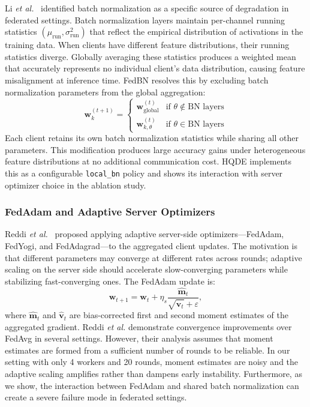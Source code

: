 \documentclass[journal,twoside]{IEEEtran}
\newcommand{\hqde}{\mbox{HQDE}\xspace}
\newcommand{\etal}{\textit{et al.}\xspace}
\begin{document}
Li \etal~\cite{li2021fedbn} identified batch normalization as a
specific source of degradation in federated settings. Batch
normalization layers maintain per-channel running statistics
$(\mu_{\text{run}}, \sigma^2_{\text{run}})$ that reflect the
empirical distribution of activations in the training data. When
clients have different feature distributions, their running statistics
diverge. Globally averaging these statistics produces a weighted mean
that accurately represents no individual client's data distribution,
causing feature misalignment at inference time. FedBN resolves this
by excluding batch normalization parameters from the global aggregation:
\begin{equation}
  \mathbf{w}_k^{(t+1)} = \begin{cases}
    \mathbf{w}_{\text{global}}^{(t)} &
      \text{if } \theta \notin \text{BN layers} \\
    \mathbf{w}_{k,\theta}^{(t)} &
      \text{if } \theta \in \text{BN layers}
  \end{cases}
  \label{eq:fedbn}
\end{equation}
Each client retains its own batch normalization statistics while sharing
all other parameters. This modification produces large accuracy gains
under heterogeneous feature distributions at no additional communication
cost. \hqde{} implements this as a configurable \texttt{local\_bn}
policy and shows its interaction with server optimizer choice in
the ablation study.

\subsubsection{FedAdam and Adaptive Server Optimizers}

Reddi \etal~\cite{reddi2021fedadam} proposed applying adaptive
server-side optimizers---FedAdam, FedYogi, and FedAdagrad---to the
aggregated client updates. The motivation is that different parameters
may converge at different rates across rounds; adaptive scaling on the
server side should accelerate slow-converging parameters while
stabilizing fast-converging ones. The FedAdam update is:
\begin{equation}
  \mathbf{w}_{t+1} = \mathbf{w}_t + \eta_s
  \frac{\hat{\mathbf{m}}_t}{\sqrt{\hat{\mathbf{v}}_t} + \varepsilon},
  \label{eq:fedadam}
\end{equation}
where $\hat{\mathbf{m}}_t$ and $\hat{\mathbf{v}}_t$ are bias-corrected
first and second moment estimates of the aggregated gradient. Reddi
\etal demonstrate convergence improvements over FedAvg in several
settings. However, their analysis assumes that moment estimates are
formed from a sufficient number of rounds to be reliable. In our
setting with only 4 workers and 20 rounds, moment estimates are noisy
and the adaptive scaling amplifies rather than dampens early instability.
Furthermore, as we show, the interaction between FedAdam and shared
batch normalization can create a severe failure mode in federated
settings.
\end{document}
